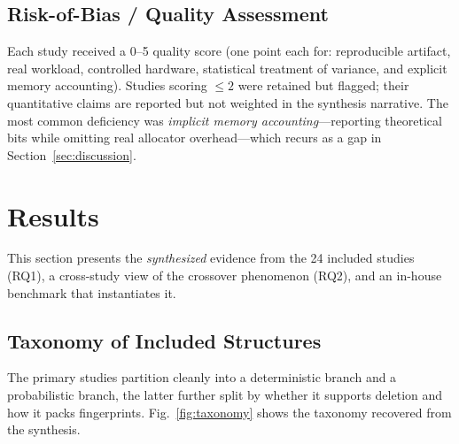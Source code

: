 \documentclass[conference]{IEEEtran}
\begin{document}
\subsection{Risk-of-Bias / Quality Assessment}
Each study received a 0--5 quality score (one point each for: reproducible
artifact, real workload, controlled hardware, statistical treatment of
variance, and explicit memory accounting). Studies scoring $\le 2$ were retained
but flagged; their quantitative claims are reported but not weighted in the
synthesis narrative. The most common deficiency was \emph{implicit memory
accounting}---reporting theoretical bits while omitting real allocator
overhead---which recurs as a gap in Section~\ref{sec:discussion}.

\section{Results}
\label{sec:results}
This section presents the \emph{synthesized} evidence from the 24 included
studies (RQ1), a cross-study view of the crossover phenomenon (RQ2), and an
in-house benchmark that instantiates it.

\subsection{Taxonomy of Included Structures}
The primary studies partition cleanly into a deterministic branch and a
probabilistic branch, the latter further split by whether it supports deletion
and how it packs fingerprints. Fig.~\ref{fig:taxonomy} shows the taxonomy
recovered from the synthesis.
\end{document}
